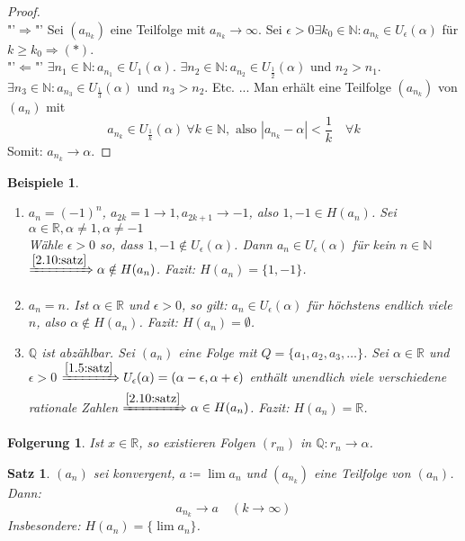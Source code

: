\documentclass[12pt]{extreport} %
\newcommand{\N}{\mathbb{N}}
\newcommand{\Q}{\mathbb{Q}}
\newcommand{\R}{\mathbb{R}}
\theoremstyle{named}
\theoremstyle{dotless}
\newtheorem{satz}[unnamedtheorem]{Satz}
\newtheorem*{beispiele}{Beispiele}
\newtheorem*{folgerung*}{Folgerung}
\begin{document}
\begin{proof} ~\\
	"'$\Rightarrow$"' Sei $(a_{n_{k}})$ eine Teilfolge mit $a_{n_{k}} \rightarrow \infty$. Sei $\epsilon > 0 \exists k_{0} \in \N: a_{n_{k}} \in U_{\epsilon}(\alpha)$ für $k \geq k_{0} \Rightarrow (*)$. \\
	"'$\Leftarrow$"' $\exists n_{1} \in \N: a_{n_{1}} \in U_{1}(\alpha)$. $\exists n_{2} \in \N: a_{n_{2}} \in U_{\frac{1}{2}}(\alpha)$ und $n_{2} > n_{1}$. $\exists n_{3} \in \N: a_{n_{3}} \in U_{\frac{1}{3}}(\alpha)$ und $n_{3} > n_{2}$. Etc. ... Man erhält eine Teilfolge $(a_{n_{k}})$ von $(a_{n})$ mit
	$$
		a_{n_{k}} \in U_{\frac{1}{k}}(\alpha) ~\forall k \in \N, \text{ also } |a_{n_{k}} - \alpha| < \frac{1}{k} \quad \forall k
	$$
	Somit: $a_{n_{k}} \rightarrow \alpha$. 
\end{proof}


\begin{beispiele}\
	\begin{enumerate}
		\item $a_{n} = (-1)^{n}$, $a_{2k} = 1 \rightarrow 1, a_{2k+1} \rightarrow -1$, also $1, -1 \in H(a_{n})$. Sei $\alpha \in \R, \alpha \neq 1, \alpha \neq -1$ \\
			Wähle $\epsilon>0$ so, dass $1, -1 \notin U_{\epsilon}(\alpha)$. Dann $a_{n} \in U_{\epsilon}(\alpha)$ für kein $n \in \N$ $\xRightarrow[]{\ref{2.10:satz}} \alpha \notin H(a_{n})$. Fazit: $H(a_{n}) = \{ 1, -1 \}$.
		\item $a_{n} = n$. Ist $\alpha \in \R$ und $\epsilon > 0$, so gilt: $a_{n} \in U_{\epsilon}(\alpha)$ für höchstens endlich viele $n$, also $\alpha \notin H(a_{n})$. Fazit: $H(a_{n}) = \emptyset$.
		\item $\Q$ ist abzählbar. Sei $(a_{n})$ eine Folge mit $Q = \{ a_{1}, a_{2}, a_{3}, \dotsc \}$. Sei $\alpha \in \R$ und $\epsilon > 0$ $\xRightarrow[]{\ref{1.5:satz}} U_{\epsilon}(\alpha) = (\alpha - \epsilon, \alpha + \epsilon)$ enthält unendlich viele verschiedene rationale Zahlen $\xRightarrow[]{\ref{2.10:satz}} \alpha \in H(a_{n})$. Fazit: $H(a_{n}) = \R$.
	\end{enumerate}	
\end{beispiele}

\begin{folgerung*}
Ist $x \in \R$, so existieren Folgen $(r_{m})$ in $\Q : r_{n} \rightarrow \alpha$.	
\end{folgerung*}


\begin{satz} \label{2.11:satz} 
	$(a_{n})$ sei konvergent, $a \coloneqq \lim a_{n}$ und $(a_{n_{k}})$ eine Teilfolge von $(a_{n})$. Dann:
	$$ a_{n_{k}} \rightarrow a \quad (k \rightarrow \infty) $$
	Insbesondere: $H(a_{n}) = \{ \lim a_{n} \}$.
\end{satz}
\end{document}

